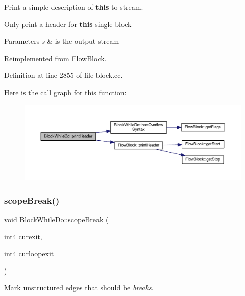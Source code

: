 Print a simple description of {\bfseries{this}} to stream. 

Only print a header for {\bfseries{this}} single block 
\begin{DoxyParams}{Parameters}
{\em s} & is the output stream \\
\hline
\end{DoxyParams}


Reimplemented from \mbox{\hyperlink{class_flow_block_a0d19c5b80186cf289dfbe0ce9e3ce37a}{Flow\+Block}}.



Definition at line 2855 of file block.\+cc.

Here is the call graph for this function\+:
\nopagebreak
\begin{figure}[H]
\begin{center}
\leavevmode
\includegraphics[width=350pt]{class_block_while_do_a298687d8d9dbe264f779cca2c89ca32e_cgraph}
\end{center}
\end{figure}
\mbox{\label{class_block_while_do_a87ab7a000da06ffdca299db53495eae0}} 
\subsubsection{\texorpdfstring{scopeBreak()}{scopeBreak()}}
{\footnotesize\ttfamily void Block\+While\+Do\+::scope\+Break (\begin{DoxyParamCaption}\item[{int4}]{curexit,  }\item[{int4}]{curloopexit }\end{DoxyParamCaption})\hspace{0.3cm}{\ttfamily [virtual]}}



Mark unstructured edges that should be {\itshape breaks}. 



